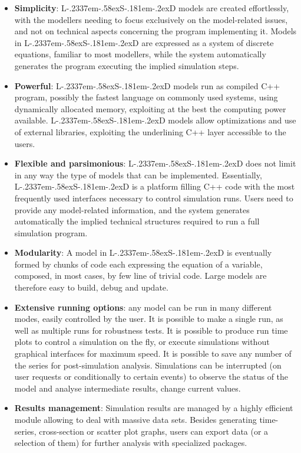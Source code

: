 \documentclass [11pt,a4paper] {book}
\def\LsD{{L\kern-.2337em\lower-.58ex\hbox{S}\kern-.181em\lower-.2ex\hbox{D}}\xspace}
\begin{document}
\begin{itemize}
 \item \textbf{Simplicity}: \LsD models are created effortlessly, with the modellers
 needing to focus exclusively on the model-related issues, and not on technical aspects concerning the program implementing it. Models in \LsD are expressed as a system of discrete equations, familiar to most modellers, while the system automatically generates the program executing the implied simulation steps.
 
 \item \textbf{Powerful}: \LsD models run as compiled C++ program, possibly the fastest language
 on commonly used systems, using dynamically allocated memory, exploiting at the best the computing
 power available. \LsD models allow optimizations and use of external libraries, exploiting the underlining C++ layer accessible to the users.

 \item \textbf{Flexible and parsimonious}: \LsD does not limit in any way the type of models that can be implemented. Essentially, \LsD is a platform filling C++ code with the most frequently used interfaces necessary to control simulation runs. Users need to provide any model-related information, and the system generates automatically the implied technical structures required to run a full simulation program.
 
\item \textbf{Modularity}: A model in \LsD is eventually formed by chunks of code each expressing the equation of a variable, composed, in most cases, by few line of trivial code. Large models are therefore easy to build, debug and update.
 
 
  \item \textbf{Extensive running options}: any model can be run in many different modes,
 easily controlled by the user. It is possible to make a single run, as well as multiple
 runs for robustness tests. It is possible to produce run time plots to control a
 simulation on the fly, or execute simulations without graphical interfaces for maximum speed. It is possible
 to save any number of the series for post-simulation analysis. Simulations can
 be interrupted (on user requests or conditionally to certain events) to observe the
 status of the model and analyse intermediate results, change current values.
 
 \item \textbf{Results management}: Simulation results are managed by a highly efficient module allowing to deal with massive data sets. Besides generating time-series, cross-section or scatter plot graphs, users can export data (or a selection of them) for further analysis with specialized packages.
 

\end{itemize}
\end{document}
